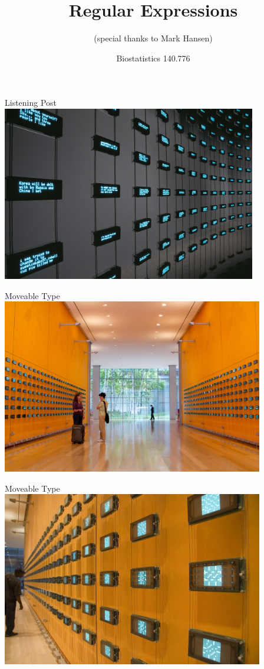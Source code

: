 \documentclass{beamer}
\title{Regular Expressions}
\subtitle{(special thanks to Mark Hansen)}
\date{Biostatistics 140.776}
\begin{document}
\begin{frame}
  \titlepage
\end{frame}

\begin{frame}{Listening Post}
\includegraphics[height=3in]{listeningpost}
\end{frame}

\begin{frame}{Moveable Type}
\includegraphics[height=3in]{MT1}
\end{frame}

\begin{frame}{Moveable Type}
\includegraphics[height=3in]{MT2}
\end{frame}
\end{document}
